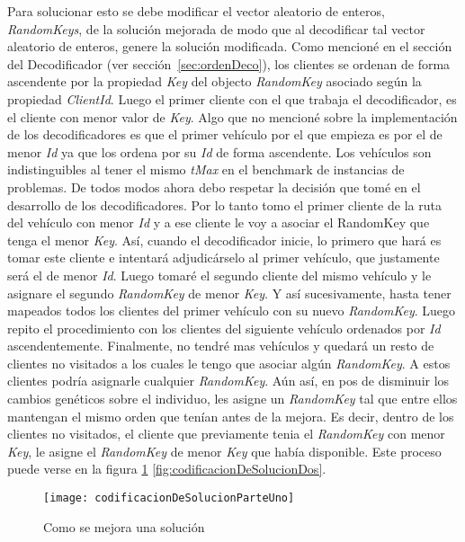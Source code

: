 Para solucionar esto se debe modificar el vector aleatorio de enteros, \textit{RandomKeys}, de la solución mejorada de modo que al decodificar tal vector aleatorio de enteros, genere la solución modificada. Como mencioné en el sección del Decodificador (ver sección~\ref{sec:ordenDeco}), los clientes se ordenan de forma ascendente por la propiedad \textit{Key} del objecto \textit{RandomKey} asociado según la propiedad \textit{ClientId}. Luego el primer cliente con el que trabaja el decodificador, es el cliente con menor valor de \textit{Key}. Algo que no mencioné sobre la implementación de los decodificadores es que el primer vehículo por el que empieza es por el de menor \textit{Id} ya que los ordena por su \textit{Id} de forma ascendente. Los vehículos son indistinguibles al tener el mismo \textit{tMax} en el benchmark de instancias de problemas. De todos modos ahora debo respetar la decisión que tomé en el desarrollo de los decodificadores. Por lo tanto tomo el primer cliente de la ruta del vehículo con menor \textit{Id} y a ese cliente le voy a asociar el {RandomKey} que tenga el menor \textit{Key}. Así, cuando el decodificador inicie, lo primero que hará es tomar este cliente e intentará adjudicárselo al primer vehículo, que justamente será el de menor \textit{Id}. Luego tomaré el segundo cliente del mismo vehículo y le asignare el segundo \textit{RandomKey} de menor \textit{Key}. Y así sucesivamente, hasta tener mapeados todos los clientes del primer vehículo con su nuevo \textit{RandomKey}. Luego repito el procedimiento con los clientes del siguiente vehículo ordenados por \textit{Id} ascendentemente. Finalmente, no tendré mas vehículos y quedará un resto de clientes no visitados a los cuales le tengo que asociar algún \textit{RandomKey}. A estos clientes podría asignarle cualquier \textit{RandomKey}. Aún así, en pos de disminuir los cambios genéticos sobre el individuo, les asigne un \textit{RandomKey} tal que entre ellos mantengan el mismo orden que tenían antes de la mejora. Es decir, dentro de los clientes no visitados, el cliente que previamente tenia el \textit{RandomKey} con menor \textit{Key}, le asigne el \textit{RandomKey} de menor \textit{Key} que había disponible.  Este proceso puede verse en la figura \ref{fig:codificacionDeSolucionUno} \ref{fig:codificacionDeSolucionDos}.

\bigskip

\begin{figure}[h]
	\caption{Como se mejora una solución}
	\centering
	\texttt{[image: codificacionDeSolucionParteUno]}
	\label{fig:codificacionDeSolucionUno}
\end{figure}

